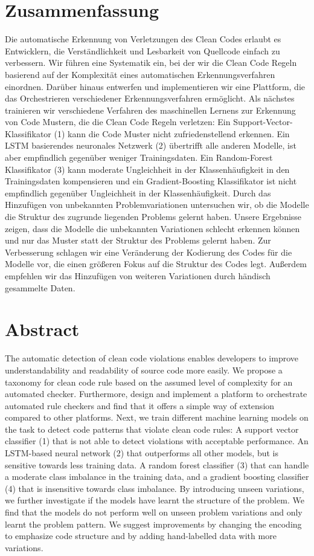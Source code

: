 \section*{Zusammenfassung}

Die automatische Erkennung von Verletzungen des Clean Codes erlaubt es Entwicklern, die Verständlichkeit und Lesbarkeit von Quellcode einfach zu verbessern. Wir führen eine Systematik ein, bei der wir die Clean Code Regeln basierend auf der Komplexität eines automatischen Erkennungsverfahren einordnen. Darüber hinaus entwerfen und implementieren wir eine Plattform, die das Orchestrieren verschiedener Erkennungsverfahren ermöglicht. Als nächstes trainieren wir verschiedene Verfahren des maschinellen Lernens zur Erkennung von Code Mustern, die die Clean Code Regeln verletzen: Ein Support-Vector-Klassifikator (1) kann die Code Muster nicht zufriedenstellend erkennen. Ein LSTM basierendes neuronales Netzwerk (2) übertrifft alle anderen Modelle, ist aber empfindlich gegenüber weniger Trainingsdaten. Ein Random-Forest Klassifikator (3) kann moderate Ungleichheit in der Klassenhäufigkeit in den Trainingsdaten kompensieren und ein Gradient-Boosting Klassifikator ist nicht empfindlich gegenüber Ungleichheit in der Klassenhäufigkeit. Durch das Hinzufügen von unbekannten Problemvariationen untersuchen wir, ob die Modelle die Struktur des zugrunde liegenden Problems gelernt haben. Unsere Ergebnisse zeigen, dass die Modelle die unbekannten Variationen schlecht erkennen können und nur das Muster statt der Struktur des Problems gelernt haben. Zur Verbesserung schlagen wir eine Veränderung der Kodierung des Codes für die Modelle vor, die einen größeren Fokus auf die Struktur des Codes legt. Außerdem empfehlen wir das Hinzufügen von weiteren Variationen durch händisch gesammelte Daten.

\newpage
\section*{Abstract}    
The automatic detection of clean code violations enables developers to improve understandability and readability of source code more easily. We propose a taxonomy for clean code rule based on the assumed level of complexity for an automated checker. Furthermore, design and implement a platform to orchestrate automated rule checkers and find that it offers a simple way of extension compared to other platforms. Next, we train different machine learning models on the task to detect code patterns that violate clean code rules: A support vector classifier (1) that is not able to detect violations with acceptable performance. An LSTM-based neural network (2) that outperforms all other models, but is sensitive towards less training data. A random forest classifier (3) that can handle a moderate class imbalance in the training data, and a gradient boosting classifier (4) that is insensitive towards class imbalance. By introducing unseen variations, we further investigate if the models have learnt the structure of the problem. We find that the models do not perform well on unseen problem variations and only learnt the problem pattern. We suggest improvements by changing the encoding to emphasize code structure and by adding hand-labelled data with more variations.